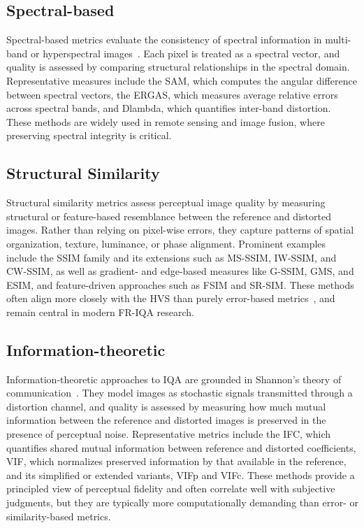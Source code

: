 \subsection{Spectral-based}\label{sec:spectral_based_metrics}

Spectral-based metrics evaluate the consistency of spectral information in multi-band or hyperspectral images~\cite{wald2000ergas, yuhas1992sam}. Each pixel is treated as a spectral vector, and quality is assessed by comparing structural relationships in the spectral domain. Representative measures include the \acf{SAM}, which computes the angular difference between spectral vectors, the \acf{ERGAS}, which measures average relative errors across spectral bands, and \acs{Dlambda}, which quantifies inter-band distortion. These methods are widely used in remote sensing and image fusion, where preserving spectral integrity is critical.

\subsection{Structural Similarity}\label{sec:similarity_based_metrics}

Structural similarity metrics assess perceptual image quality by measuring structural or feature-based resemblance between the reference and distorted images. 
Rather than relying on pixel-wise errors, they capture patterns of spatial organization, texture, luminance, or phase alignment. 
Prominent examples include the \acf{SSIM} family and its extensions such as \acs{MS-SSIM}, \acs{IW-SSIM}, and \acs{CW-SSIM}, 
as well as gradient- and edge-based measures like \acs{G-SSIM}, \acs{GMS}, and \acs{ESIM}, and feature-driven approaches such as \acs{FSIM} and \acs{SR-SIM}. 
These methods often align more closely with the \acs{HVS} than purely error-based metrics~\cite{wang2004image, xue2014gmsd}, 
and remain central in modern \acs{FR-IQA} research. 

\subsection{Information-theoretic}\label{sec:information_theoretic_metrics}

Information-theoretic approaches to \acs{IQA} are grounded in Shannon's theory of communication~\cite{shannon1948mathematical,cover1999elements}. 
They model images as stochastic signals transmitted through a distortion channel, and quality is assessed by measuring how much mutual information between the reference and distorted images is preserved in the presence of perceptual noise. 
Representative metrics include the \acf{IFC}, which quantifies shared mutual information between reference and distorted coefficients, \acf{VIF}, which normalizes preserved information by that available in the reference, and its simplified or extended variants, \acs{VIFp} and \acs{VIFc}. 
These methods provide a principled view of perceptual fidelity and often correlate well with subjective judgments, but they are typically more computationally demanding than error- or similarity-based metrics. 


